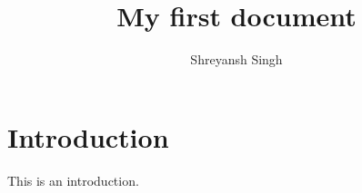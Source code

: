 \documentclass{article}
\author{Shreyansh Singh}
\title{My first document}
\begin{document}
\maketitle

\section{Introduction}
This is an introduction.
\end{document}
